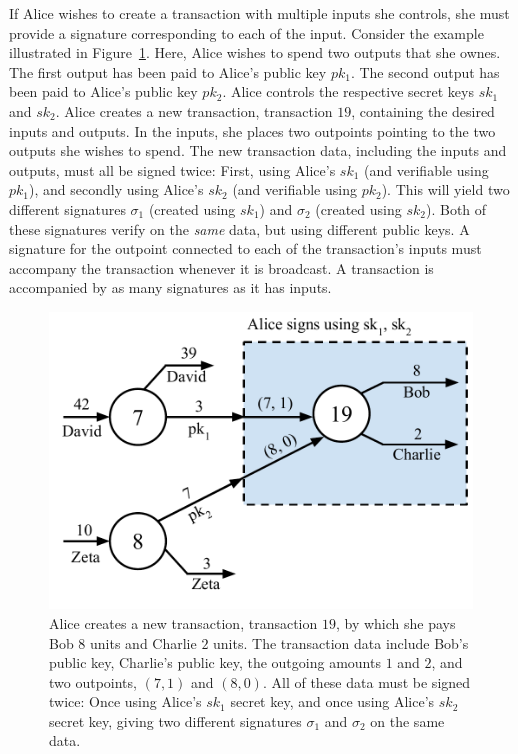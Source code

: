 If Alice wishes to create a transaction with multiple inputs she controls, she must
provide a signature corresponding to each of the input. Consider the example illustrated
in Figure~\ref{fig.utxo-sig-multi}. Here, Alice wishes to spend two outputs that she
ownes. The first output has been paid to Alice's public key $pk_1$. The second output
has been paid to Alice's public key $pk_2$. Alice controls the respective secret keys
$sk_1$ and $sk_2$. Alice creates a new transaction, transaction $19$, containing the
desired inputs and outputs. In the inputs, she places two outpoints pointing to the
two outputs she wishes to spend. The new transaction data, including the inputs and outputs,
must all be signed twice: First, using Alice's $sk_1$ (and verifiable using $pk_1$),
and secondly using Alice's $sk_2$ (and verifiable using $pk_2$). This will yield two
different signatures $\sigma_1$ (created using $sk_1$) and $\sigma_2$ (created using
$sk_2$). Both of these signatures verify on the \emph{same} data, but using different
public keys. A signature for the outpoint connected to each of the transaction's inputs
must accompany the transaction whenever it is broadcast. A transaction is accompanied
by as many signatures as it has inputs.

\begin{figure}[h]
    \centering
    \includegraphics[width=0.65 \columnwidth,keepaspectratio]{figures/utxo-sig-multi.pdf}
    \caption{Alice creates a new transaction, transaction $19$, by which she pays Bob
             $8$ units
             and Charlie $2$ units.
             The transaction data include Bob's public key, Charlie's public key,
             the outgoing amounts $1$ and $2$, and two outpoints, $(7, 1)$ and $(8, 0)$.
             All of these data must be signed twice: Once using Alice's $sk_1$ secret key,
             and once using Alice's $sk_2$ secret key, giving two different signatures
             $\sigma_1$ and $\sigma_2$ on the same data.}
    \label{fig.utxo-sig-multi}
\end{figure}

